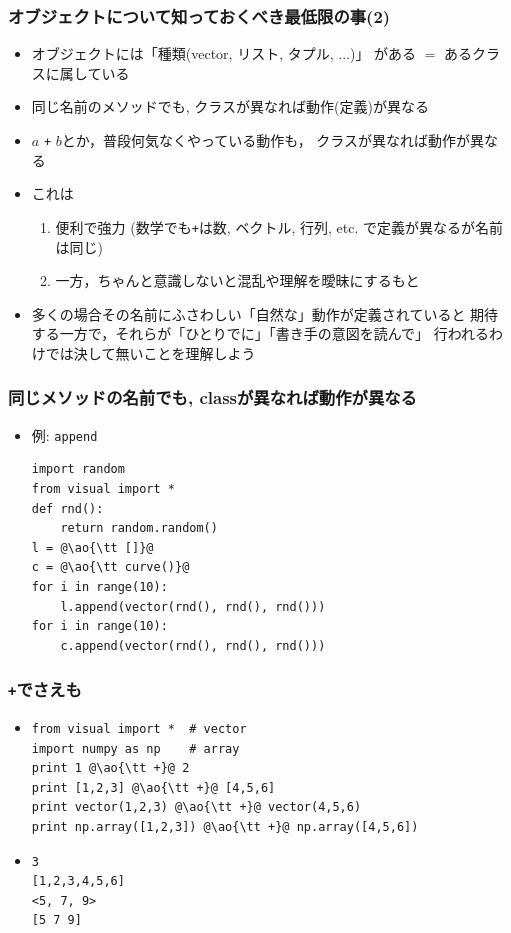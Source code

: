 \documentclass[10pt,dvipdfmx]{beamer}
\newcommand{\ao}[1]{{\color{blue}#1}}
\begin{document}
\begin{frame}
\frametitle{オブジェクトについて知っておくべき最低限の事(2)}
\begin{itemize}
\item オブジェクトには「種類(vector, リスト, タプル, ...)」
がある $=$ ある\ao{クラス}に属している
\item \ao{同じ名前のメソッドでも, クラスが異なれば動作(定義)が異なる}
\item \ao{$a$ {\tt +} $b$とか，普段何気なくやっている動作も，}
  クラスが異なれば動作が異なる
\item これは
  \begin{enumerate}
  \item 便利で強力 (数学でも{\tt +}は数, ベクトル, 行列, etc.
    で定義が異なるが名前は同じ)
  \item 一方，ちゃんと意識しないと混乱や理解を曖昧にするもと
  \end{enumerate}
\item 多くの場合その名前にふさわしい「自然な」動作が定義されていると
期待する一方で，それらが「ひとりでに」「書き手の意図を読んで」
行われるわけでは決して無いことを理解しよう
\end{itemize}
\end{frame}

\begin{frame}[fragile]
\frametitle{同じメソッドの名前でも, classが異なれば動作が異なる}
\begin{itemize}
\item 例: {\tt append}
\begin{lstlisting}
import random
from visual import *
def rnd():
    return random.random()
l = @\ao{\tt []}@
c = @\ao{\tt curve()}@
for i in range(10):
    l.append(vector(rnd(), rnd(), rnd()))
for i in range(10):
    c.append(vector(rnd(), rnd(), rnd()))
\end{lstlisting}
\end{itemize}
\end{frame}


\begin{frame}[fragile]
\frametitle{{\tt +}でさえも}
\begin{itemize}
\item<1-> []
\begin{lstlisting}
from visual import *  # vector
import numpy as np    # array
print 1 @\ao{\tt +}@ 2
print [1,2,3] @\ao{\tt +}@ [4,5,6]
print vector(1,2,3) @\ao{\tt +}@ vector(4,5,6)
print np.array([1,2,3]) @\ao{\tt +}@ np.array([4,5,6])
\end{lstlisting}

\item<2-> []
\begin{lstlisting}
3
[1,2,3,4,5,6]
<5, 7, 9>
[5 7 9]
\end{lstlisting}
\end{itemize}
\end{frame}
\end{document}
